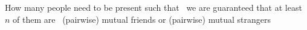 \documentclass[preview]{standalone}
\begin{document}
\begin{center}
How many people need to be present such that \ we are guaranteed that at least $n$ of them are \ (pairwise) mutual friends or (pairwise) mutual strangers
\end{center}
\end{document}
